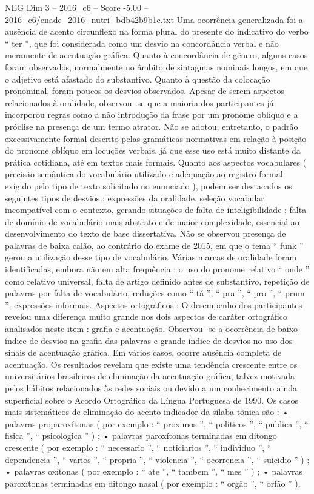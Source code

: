 \begin{textsample}{NEG Dim 3 – 2016\_c6 – Score -5.00 – 2016\_c6/enade\_2016\_nutri\_bdb42b9b1c.txt}
Uma ocorrência generalizada foi a ausência de acento circunflexo na forma plural do presente do indicativo do verbo “ ter ”, que foi considerada como um desvio na concordância verbal e não meramente de acentuação gráfica.
Quanto à concordância de gênero, alguns casos foram observados, normalmente no âmbito de sintagmas nominais longos, em que o adjetivo está afastado do substantivo.
Quanto à questão da colocação pronominal, foram poucos os desvios observados.
Apesar de serem aspectos relacionados à oralidade, observou -se que a maioria dos participantes já incorporou regras como a não introdução da frase por um pronome oblíquo e a próclise na presença de um termo atrator.
Não se adotou, entretanto, o padrão excessivamente formal descrito pelas gramáticas normativas em relação à posição do pronome oblíquo em locuções verbais, já que esse uso está muito distante da prática cotidiana, até em textos mais formais.
Quanto aos aspectos vocabulares ( precisão semântica do vocabulário utilizado e adequação ao registro formal exigido pelo tipo de texto solicitado no enunciado ), podem ser destacados os seguintes tipos de desvios : expressões da oralidade, seleção vocabular incompatível com o contexto, gerando situações de falta de inteligibilidade ; falta de domínio de vocabulário mais abstrato e de maior complexidade, essencial ao desenvolvimento do texto de base dissertativa.
Não se observou presença de palavras de baixa calão, ao contrário do exame de 2015, em que o tema “ funk ” gerou a utilização desse tipo de vocabulário.
Várias marcas de oralidade foram identificadas, embora não em alta frequência : o uso do pronome relativo “ onde ” como relativo universal, falta de artigo definido antes de substantivo, repetição de palavras por falta de vocabulário, reduções como “ tá ”, “ pra ”, “ pro ”, “ prum ”, expressões informais.
Aspectos ortográficos : O desempenho dos participantes revelou uma diferença muito grande nos dois aspectos de caráter ortográfico analisados neste item : grafia e acentuação.
Observou -se a ocorrência de baixo índice de desvios na grafia das palavras e grande índice de desvios no uso dos sinais de acentuação gráfica.
Em vários casos, ocorre ausência completa de acentuação.
Os resultados revelam que existe uma tendência crescente entre os universitários brasileiros de eliminação da acentuação gráfica, talvez motivada pelos hábitos relacionados às redes sociais ou devido a um conhecimento ainda superficial sobre o Acordo Ortográfico da Língua Portuguesa de 1990.
Os casos mais sistemáticos de eliminação do acento indicador da sílaba tônica são : • palavras proparoxítonas ( por exemplo : “ proximos ”, “ politicos ”, “ publica ”, “ fisica ”, “ psicologica ” ) ; • palavras paroxítonas terminadas em ditongo crescente ( por exemplo : “ necessario ”, “ noticiarios ”, “ individuo ”, “ dependencia ”, “ varios ”, “ propria ”, “ violencia ”, “ ocorrencia ”, “ suicidio ” ) ; • palavras oxítonas ( por exemplo : “ ate ”, “ tambem ”, “ mes ” ) ; • palavras paroxítonas terminadas em ditongo nasal ( por exemplo : “ orgão ”, “ orfão ” ).

\end{textsample}
